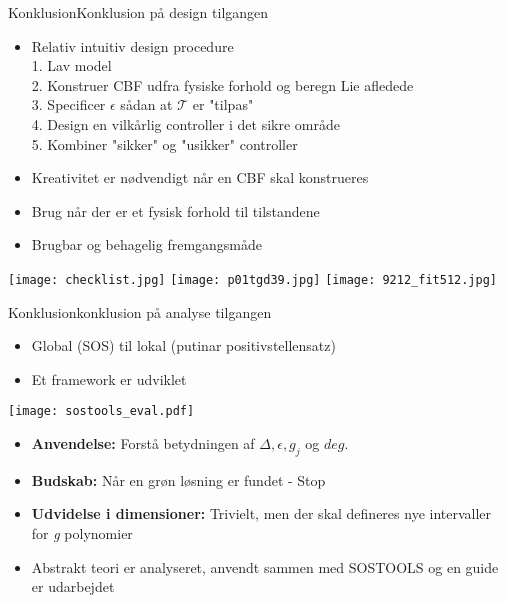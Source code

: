 \begin{frame}{Konklusion}{Konklusion på design tilgangen}
\begin{itemize}
	\item Relativ intuitiv design procedure \\	\vspace*{0.08cm}
	\scriptsize {\color{white}{m}} 1. Lav model \\	
    \scriptsize {\color{white}{m}} 2. Konstruer CBF udfra fysiske forhold og beregn Lie afledede\\	
    \scriptsize {\color{white}{m}} 3. Specificer $\epsilon$ sådan at $\mathcal{T}$ er "tilpas" \\	
    \scriptsize {\color{white}{m}} 4. Design en vilkårlig controller i det sikre område \\ 	
    \scriptsize {\color{white}{m}} 5. Kombiner "sikker" og "usikker" controller \\
	\item \normalsize Kreativitet er nødvendigt når en CBF skal konstrueres
	\item Brug når der er et fysisk forhold til tilstandene
	\item Brugbar og behagelig fremgangsmåde
\end{itemize}
\vspace*{0.2cm}
\texttt{[image: checklist.jpg]} \hspace*{0.2cm}
\texttt{[image: p01tgd39.jpg]} \hspace*{0.2cm}
\texttt{[image: 9212\_fit512.jpg]}
\end{frame}



\begin{frame}{Konklusion}{konklusion på analyse tilgangen}
\begin{itemize}
	\item Global (SOS) til lokal (putinar positivstellensatz)
	\item Et framework er udviklet
\end{itemize}

\texttt{[image: sostools\_eval.pdf]}

\begin{itemize}
	\item \textbf{Anvendelse:} Forstå betydningen af $\Delta, \epsilon, g_j$ og $deg$.
	\item \textbf{Budskab:} Når en grøn løsning er fundet - Stop
	\item \textbf{Udvidelse i dimensioner:} Trivielt, men der skal defineres nye intervaller for \textit{g} polynomier 
	\item Abstrakt teori er analyseret, anvendt sammen med SOSTOOLS og en guide er udarbejdet
\end{itemize}

\end{frame}

